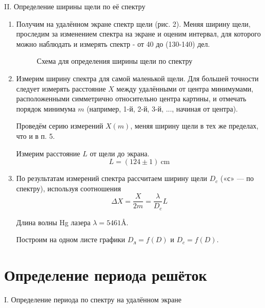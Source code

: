 \begin{center}
II. Определение ширины щели по её спектру
\end{center}

\begin{enumerate}
    \item
    Получим на удалённом экране спектр щели (рис. 2). Меняя ширину щели, проследим за изменением спектра на экране и оценим интервал, для которого можно наблюдать и измерять спектр - от 40 до (130-140) дел.
    
    \begin{figure}[h]
    \caption{Схема для определения ширины щели по спектру}
    \end{figure}
   
    \item
    Измерим ширину спектра для самой маленькой щели. Для большей точности следует измерять расстояние $X$ между удалёнными от центра минимумами, расположенными симметрично относительно центра картины, и отмечать порядок минимума $m$ (например, 1-й, 2-й, 3-й, ..., начиная от центра).
    
    Проведём серию измерений $X(m)$, меняя ширину щели в тех же пределах, что и в п. 5.
    
    Измерим расстояние $L$ от щели до экрана.
    $$ L = (124 \pm 1)~\text{cm}$$
    
    \item
    По результатам измерений спектра рассчитаем ширину щели $D_c$ («с» — по спектру), используя соотношения
    $$ \Delta X = \frac{X}{2m} = \frac{\lambda}{D_c}L$$
    
    Длина волны Hg лазера $\lambda = 5461 \text{\AA}$.
    
    Построим на одном листе графики $D_{\text{л}} = f(D)$ и $D_c = f(D).$
    
    \begin{figure}[h]
    \end{figure}
    
\end{enumerate}

\section{\label{sec:level1}Определение периода решёток}

\begin{center}
I. Определение периода по спектру на удалённом экране
\end{center}

